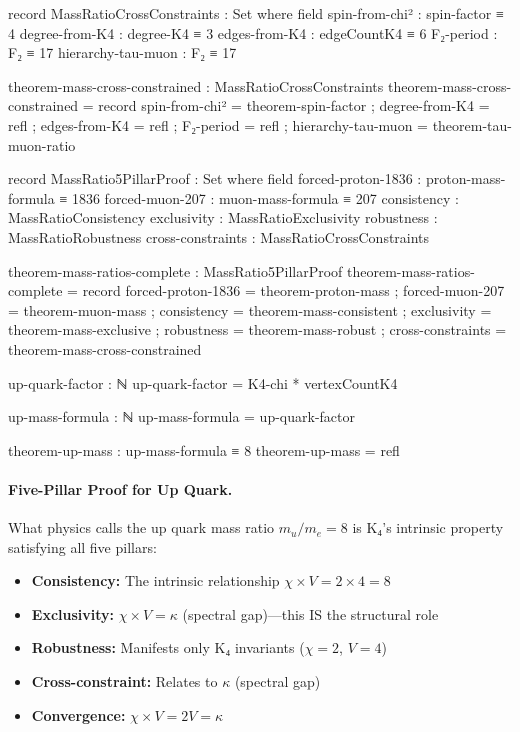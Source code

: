 \documentclass[11pt,a4paper]{book}
\begin{document}
\begin{code}
record MassRatioCrossConstraints : Set where
  field
    spin-from-chi²      : spin-factor ≡ 4
    degree-from-K4      : degree-K4 ≡ 3
    edges-from-K4       : edgeCountK4 ≡ 6
    F₂-period          : F₂ ≡ 17
    hierarchy-tau-muon  : F₂ ≡ 17

theorem-mass-cross-constrained : MassRatioCrossConstraints
theorem-mass-cross-constrained = record
  { spin-from-chi² = theorem-spin-factor
  ; degree-from-K4 = refl
  ; edges-from-K4 = refl
  ; F₂-period = refl
  ; hierarchy-tau-muon = theorem-tau-muon-ratio
  }

record MassRatio5PillarProof : Set where
  field
    forced-proton-1836   : proton-mass-formula ≡ 1836
    forced-muon-207      : muon-mass-formula ≡ 207
    consistency          : MassRatioConsistency
    exclusivity          : MassRatioExclusivity
    robustness           : MassRatioRobustness
    cross-constraints    : MassRatioCrossConstraints

theorem-mass-ratios-complete : MassRatio5PillarProof
theorem-mass-ratios-complete = record
  { forced-proton-1836 = theorem-proton-mass
  ; forced-muon-207 = theorem-muon-mass
  ; consistency = theorem-mass-consistent
  ; exclusivity = theorem-mass-exclusive
  ; robustness = theorem-mass-robust
  ; cross-constraints = theorem-mass-cross-constrained
  }
\end{code}

\begin{code}
up-quark-factor : ℕ
up-quark-factor = K4-chi * vertexCountK4

up-mass-formula : ℕ
up-mass-formula = up-quark-factor

theorem-up-mass : up-mass-formula ≡ 8
theorem-up-mass = refl
\end{code}

\paragraph{Five-Pillar Proof for Up Quark.}
What physics calls the up quark mass ratio $m_u/m_e = 8$ is K₄'s intrinsic property satisfying all five pillars:
\begin{itemize}
\item \textbf{Consistency:} The intrinsic relationship $\chi \times V = 2 \times 4 = 8$
\item \textbf{Exclusivity:} $\chi \times V = \kappa$ (spectral gap)—this IS the structural role
\item \textbf{Robustness:} Manifests only K₄ invariants ($\chi = 2$, $V = 4$)
\item \textbf{Cross-constraint:} Relates to $\kappa$ (spectral gap)
\item \textbf{Convergence:} $\chi \times V = 2V = \kappa$
\end{itemize}
\end{document}

